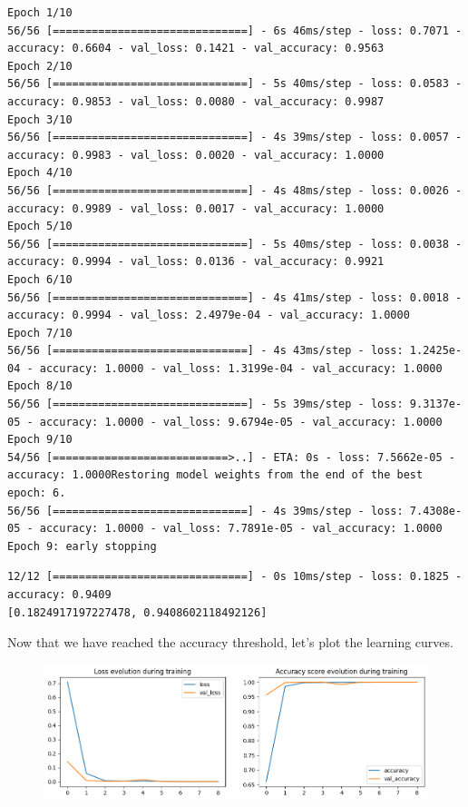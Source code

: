 \documentclass{article}
\begin{document}
\begin{lstlisting}[style=output]
Epoch 1/10
56/56 [==============================] - 6s 46ms/step - loss: 0.7071 - accuracy: 0.6604 - val_loss: 0.1421 - val_accuracy: 0.9563
Epoch 2/10
56/56 [==============================] - 5s 40ms/step - loss: 0.0583 - accuracy: 0.9853 - val_loss: 0.0080 - val_accuracy: 0.9987
Epoch 3/10
56/56 [==============================] - 4s 39ms/step - loss: 0.0057 - accuracy: 0.9983 - val_loss: 0.0020 - val_accuracy: 1.0000
Epoch 4/10
56/56 [==============================] - 4s 48ms/step - loss: 0.0026 - accuracy: 0.9989 - val_loss: 0.0017 - val_accuracy: 1.0000
Epoch 5/10
56/56 [==============================] - 5s 40ms/step - loss: 0.0038 - accuracy: 0.9994 - val_loss: 0.0136 - val_accuracy: 0.9921
Epoch 6/10
56/56 [==============================] - 4s 41ms/step - loss: 0.0018 - accuracy: 0.9994 - val_loss: 2.4979e-04 - val_accuracy: 1.0000
Epoch 7/10
56/56 [==============================] - 4s 43ms/step - loss: 1.2425e-04 - accuracy: 1.0000 - val_loss: 1.3199e-04 - val_accuracy: 1.0000
Epoch 8/10
56/56 [==============================] - 5s 39ms/step - loss: 9.3137e-05 - accuracy: 1.0000 - val_loss: 9.6794e-05 - val_accuracy: 1.0000
Epoch 9/10
54/56 [===========================>..] - ETA: 0s - loss: 7.5662e-05 - accuracy: 1.0000Restoring model weights from the end of the best epoch: 6.
56/56 [==============================] - 4s 39ms/step - loss: 7.4308e-05 - accuracy: 1.0000 - val_loss: 7.7891e-05 - val_accuracy: 1.0000
Epoch 9: early stopping
\end{lstlisting}



\begin{lstlisting}[style=output]
12/12 [==============================] - 0s 10ms/step - loss: 0.1825 - accuracy: 0.9409
[0.1824917197227478, 0.9408602118492126]
\end{lstlisting}

Now that we have reached the accuracy threshold, let's plot the learning curves.

\FloatBarrier



\begin{figure}[h]
    \centering
    \includegraphics[scale = 0.48]{dl-figures/cnn-ex-1-learning-curves.png}
    \label{figure:cnn-ex-1-learning-curves}
\end{figure}
\end{document}
